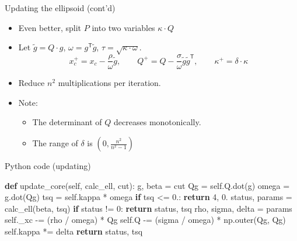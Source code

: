 \documentclass[10pt,ignorenonframetext,serif,onlymath]{beamer}
\newenvironment{Shaded}{}{}
\newcommand{\ControlFlowTok}[1]{\textcolor[rgb]{0.00,0.44,0.13}{\textbf{#1}}}
\newcommand{\DecValTok}[1]{\textcolor[rgb]{0.25,0.63,0.44}{#1}}
\newcommand{\FloatTok}[1]{\textcolor[rgb]{0.25,0.63,0.44}{#1}}
\newcommand{\KeywordTok}[1]{\textcolor[rgb]{0.00,0.44,0.13}{\textbf{#1}}}
\newcommand{\NormalTok}[1]{#1}
\newcommand{\OperatorTok}[1]{\textcolor[rgb]{0.40,0.40,0.40}{#1}}
\newcommand{\VariableTok}[1]{\textcolor[rgb]{0.10,0.09,0.49}{#1}}
\providecommand{\tightlist}{%
  \setlength{\itemsep}{0pt}\setlength{\parskip}{0pt}}
\begin{document}
\begin{frame}{Updating the ellipsoid (cont’d)}
\protect\hypertarget{updating-the-ellipsoid-contd}{}

\begin{itemize}
\tightlist
\item
  Even better, split \(P\) into two variables \(\kappa \cdot Q\)
\item
  Let \(\tilde{g} = Q \cdot g\), \(\omega = g^\mathsf{T}\tilde{g}\),
  \(\tau = \sqrt{\kappa\cdot\omega}\).
  \[x_c^+ = x_c - \frac{\rho}{\omega} \tilde{g}, \qquad
  Q^+ = Q - \frac{\sigma}{\omega} \tilde{g}\tilde{g}^\mathsf{T}, \qquad
  \kappa^+ =  \delta\cdot\kappa
   \]
\item
  Reduce \(n^2\) multiplications per iteration.
\item
  Note:

  \begin{itemize}
  \tightlist
  \item
    The determinant of \(Q\) decreases monotonically.
  \item
    The range of \(\delta\) is \((0, \frac{n^2}{n^2 - 1})\)
  \end{itemize}
\end{itemize}

\end{frame}

\begin{frame}[fragile]{Python code (updating)}
\protect\hypertarget{python-code-updating}{}

\begin{Shaded}
\begin{Highlighting}[]
\KeywordTok{def}\NormalTok{ update_core(}\VariableTok{self}\NormalTok{, calc_ell, cut):}
\NormalTok{    g, beta }\OperatorTok{=}\NormalTok{ cut}
\NormalTok{    Qg }\OperatorTok{=} \VariableTok{self}\NormalTok{.Q.dot(g)}
\NormalTok{    omega }\OperatorTok{=}\NormalTok{ g.dot(Qg)}
\NormalTok{    tsq }\OperatorTok{=} \VariableTok{self}\NormalTok{.kappa }\OperatorTok{*}\NormalTok{ omega}
    \ControlFlowTok{if}\NormalTok{ tsq }\OperatorTok{<=} \FloatTok{0.}\NormalTok{:}
        \ControlFlowTok{return} \DecValTok{4}\NormalTok{, }\FloatTok{0.}
\NormalTok{    status, params }\OperatorTok{=}\NormalTok{ calc_ell(beta, tsq)}
    \ControlFlowTok{if}\NormalTok{ status }\OperatorTok{!=} \DecValTok{0}\NormalTok{:}
        \ControlFlowTok{return}\NormalTok{ status, tsq}
\NormalTok{    rho, sigma, delta }\OperatorTok{=}\NormalTok{ params}
    \VariableTok{self}\NormalTok{._xc }\OperatorTok{-=}\NormalTok{ (rho }\OperatorTok{/}\NormalTok{ omega) }\OperatorTok{*}\NormalTok{ Qg}
    \VariableTok{self}\NormalTok{.Q }\OperatorTok{-=}\NormalTok{ (sigma }\OperatorTok{/}\NormalTok{ omega) }\OperatorTok{*}\NormalTok{ np.outer(Qg, Qg)}
    \VariableTok{self}\NormalTok{.kappa }\OperatorTok{*=}\NormalTok{ delta}
    \ControlFlowTok{return}\NormalTok{ status, tsq}
\end{Highlighting}
\end{Shaded}

\end{frame}
\end{document}
